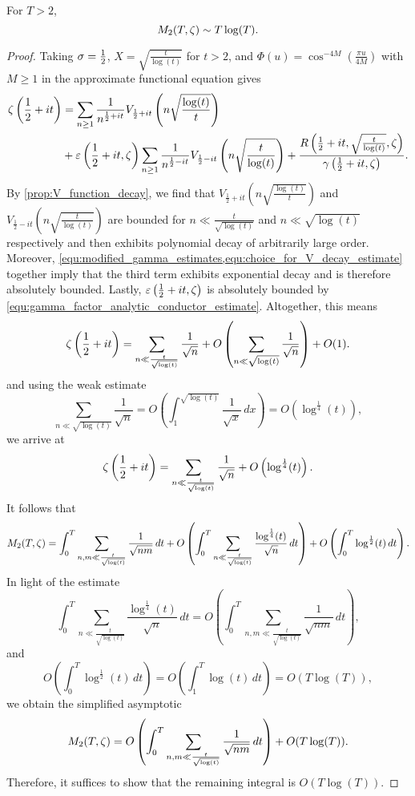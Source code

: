     \begin{theorem}
      For $T > 2$,
      \[
        M_{2}(T,\zeta) \sim T\log(T).
      \]
    \end{theorem}
    \begin{proof}
      Taking $\sigma = \frac{1}{2}$, $X = \sqrt{\frac{t}{\log(t)}}$ for $t > 2$, and $\Phi(u) = \cos^{-4M}\left(\frac{\pi u}{4M}\right)$ with $M \ge 1$ in the approximate functional equation gives
      \begin{align*}
        \zeta\left(\frac{1}{2}+it\right) &= \sum_{n \ge 1}\frac{1}{n^{\frac{1}{2}+it}}V_{\frac{1}{2}+it}\left(n\sqrt{\frac{\log(t)}{t}}\right) \\
        &+ \varepsilon\left(\frac{1}{2}+it,\zeta\right)\sum_{n \ge 1}\frac{1}{n^{\frac{1}{2}-it}}V_{\frac{1}{2}-it}\left(n\sqrt{\frac{t}{\log(t)}}\right)+\frac{R\left(\frac{1}{2}+it,\sqrt{\frac{t}{\log(t)}},\zeta\right)}{\gamma\left(\frac{1}{2}+it,\zeta\right)}.
      \end{align*}
      By \cref{prop:V_function_decay}, we find that $V_{\frac{1}{2}+it}\left(n\sqrt{\frac{\log(t)}{t}}\right)$ and $V_{\frac{1}{2}-it}\left(n\sqrt{\frac{t}{\log(t)}}\right)$ are bounded for $n \ll \frac{t}{\sqrt{\log(t)}}$ and $n \ll \sqrt{\log(t)}$ respectively and then exhibits polynomial decay of arbitrarily large order. Moreover, \cref{equ:modified_gamma_estimates,equ:choice_for_V_decay_estimate} together imply that the third term exhibits exponential decay and is therefore absolutely bounded. Lastly, $\varepsilon\left(\frac{1}{2}+it,\zeta\right)$ is absolutely bounded by \cref{equ:gamma_factor_analytic_conductor_estimate}. Altogether, this means
      \[
        \zeta\left(\frac{1}{2}+it\right) = \sum_{n \ll \frac{t}{\sqrt{\log(t)}}}\frac{1}{\sqrt{n}}+O\left(\sum_{n \ll \sqrt{\log(t)}}\frac{1}{\sqrt{n}}\right)+O(1).
      \]
      and using the weak estimate
      \[
        \sum_{n \ll \sqrt{\log(t)}}\frac{1}{\sqrt{n}} = O\left(\int_{1}^{\sqrt{\log(t)}}\frac{1}{\sqrt{x}}\,dx\right) = O\left(\log^{\frac{1}{4}}(t)\right),
      \]
      we arrive at
      \[
        \zeta\left(\frac{1}{2}+it\right) = \sum_{n \ll \frac{t}{\sqrt{\log(t)}}}\frac{1}{\sqrt{n}}+O\left(\log^{\frac{1}{4}}(t)\right).
      \]
      It follows that
      \[
        M_{2}(T,\zeta) = \int_{0}^{T}\sum_{n,m \ll \frac{t}{\sqrt{\log(t)}}}\frac{1}{\sqrt{nm}}\,dt+O\left(\int_{0}^{T}\sum_{n \ll \frac{t}{\sqrt{\log(t)}}}\frac{\log^{\frac{1}{4}}(t)}{\sqrt{n}}\,dt\right)+O\left(\int_{0}^{T}\log^{\frac{1}{2}}(t)\,dt\right).
      \]
      In light of the estimate
      \[
        \int_{0}^{T}\sum_{n \ll \frac{t}{\sqrt{\log(t)}}}\frac{\log^{\frac{1}{4}}(t)}{\sqrt{n}}\,dt = O\left(\int_{0}^{T}\sum_{n,m \ll \frac{t}{\sqrt{\log(t)}}}\frac{1}{\sqrt{nm}}\,dt\right),
      \]
      and
      \[
        O\left(\int_{0}^{T}\log^{\frac{1}{2}}(t)\,dt\right) = O\left(\int_{1}^{T}\log(t)\,dt\right) = O(T\log(T)),
      \]
      we obtain the simplified asymptotic
      \[
        M_{2}(T,\zeta) = O\left(\int_{0}^{T}\sum_{n,m \ll \frac{t}{\sqrt{\log(t)}}}\frac{1}{\sqrt{nm}}\,dt\right)+O(T\log(T)).
      \]
      Therefore, it suffices to show that the remaining integral is $O(T\log(T))$. 
    \end{proof}